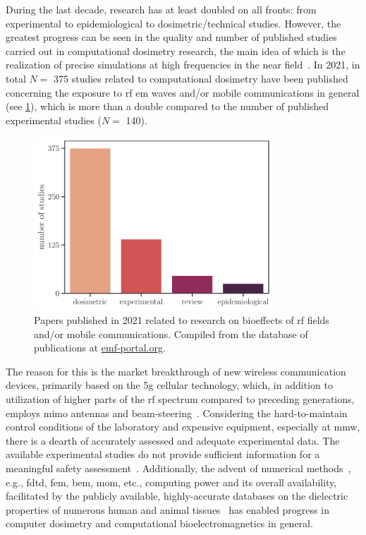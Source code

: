 During the last decade, research has at least doubled on all fronts: from experimental to epidemiological to dosimetric/technical studies.
However, the greatest progress can be seen in the quality and number of published studies carried out in computational dosimetry research, the main idea of which is the realization of precise simulations at high frequencies in the near field~\cite{Diao2021Effect}.
In 2021, in total $N = $ 375 studies related to computational dosimetry have been published concerning the exposure to \gls{rf} \gls{em} waves and/or mobile communications in general (see \cref{fig:research_compilation_2021}), which is more than a double compared to the number of published experimental studies ($N = $ 140).
\begin{figure}[ht]
    \centering
    \includegraphics[width=0.8\textwidth]{artwork/research_compilation_2021.pdf}
    \caption{Papers published in 2021 related to research on bioeffects of \gls{rf} fields and/or mobile communications. Compiled from the database of publications at \url{emf-portal.org}.}
    \label{fig:research_compilation_2021}
\end{figure}
The reason for this is the market breakthrough of new wireless communication devices, primarily based on the \gls{5g} cellular technology, which, in addition to utilization of higher parts of the \gls{rf} spectrum compared to preceding generations, employs \gls{mimo} antennas and beam-steering~\cite{Andrews2014What}.
Considering the hard-to-maintain control conditions of the laboratory and expensive equipment, especially at \gls{mmw}, there is a dearth of accurately assessed and adequate experimental data.
The available experimental studies do not provide sufficient information for a meaningful safety assessment~\cite{Simkó20195G}.
Additionally, the advent of numerical methods~\cite{Poljak2018On}, e.g., \gls{fdtd}, \gls{fem}, \gls{bem}, \gls{mom}, etc., computing power and its overall availability, facilitated by the publicly available, highly-accurate databases on the dielectric properties of numerous human and animal tissues~\cite{Gabriel1996Compilation} has enabled progress in computer dosimetry and computational bioelectromagnetics in general.
